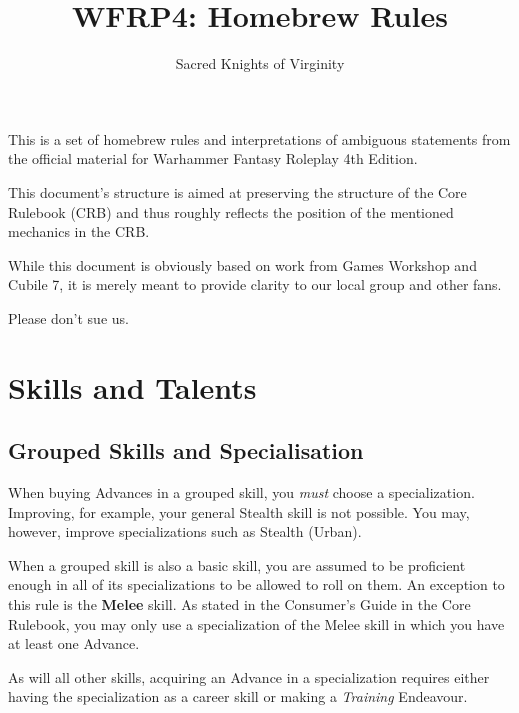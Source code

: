\documentclass[parskip=full,11pt]{wfrp-short}
\title{WFRP4: Homebrew Rules}
\author{Sacred Knights of Virginity}
\begin{document}
\maketitle
\thispagestyle{empty} %

\section*{} %
\vspace{5pt}
This is a set of homebrew rules and interpretations of ambiguous statements
from the official material for Warhammer Fantasy Roleplay 4th Edition.

This document's structure is aimed at preserving the structure of the Core
Rulebook (CRB) and thus roughly reflects the position of the mentioned
mechanics in the CRB.

While this document is obviously based on work from Games Workshop and Cubile
7, it is merely meant to provide clarity to our local group and other fans.

Please don't sue us.

\pagebreak
\tableofcontents

\pagebreak

\section{Skills and Talents}

\subsection{Grouped Skills and Specialisation}
When buying Advances in a grouped skill, you \textit{must} choose a
specialization.
Improving, for example, your general Stealth skill is not possible.
You may, however, improve specializations such as Stealth (Urban).

When a grouped skill is also a basic skill, you are assumed to be proficient
enough in all of its specializations to be allowed to roll on them.
An exception to this rule is the \textbf{Melee} skill.
As stated in the Consumer's Guide in the Core Rulebook, you may only use a
specialization of the Melee skill in which you have at least one Advance.

As will all other skills, acquiring an Advance in a specialization requires
either having the specialization as a career skill or making a
\textit{Training} Endeavour.
\end{document}
